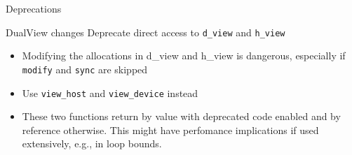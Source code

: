 
\begin{frame}[fragile]

  {\Huge Deprecations}

  \vspace{10pt}

\end{frame}






%        



\begin{frame}[fragile]{DualView changes}
  Deprecate direct access to \texttt{d\_view} and \texttt{h\_view}
  \begin{itemize}
    \item Modifying the allocations in d\_view and h\_view is dangerous, especially if \texttt{modify} and \texttt{sync} are skipped
    \item Use \texttt{view\_host} and \texttt{view\_device} instead
    \item These two functions return by value with deprecated code enabled and by reference otherwise. This might have perfomance implications if used extensively, e.g., in loop bounds.
  \end{itemize}
\end{frame}

